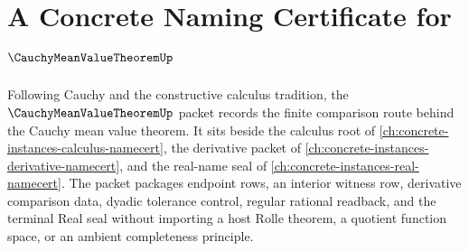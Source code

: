 \chapter{A Concrete Naming Certificate for $\CauchyMeanValueTheoremUp$}
\label{ch:concrete-instances-cauchy-mean-value-theorem-namecert}

Following Cauchy and the constructive calculus tradition, the $\CauchyMeanValueTheoremUp$ packet records the finite comparison route behind the Cauchy mean value theorem. It sits beside the calculus root of \autoref{ch:concrete-instances-calculus-namecert}, the derivative packet of \autoref{ch:concrete-instances-derivative-namecert}, and the real-name seal of \autoref{ch:concrete-instances-real-namecert}. The packet packages endpoint rows, an interior witness row, derivative comparison data, dyadic tolerance control, regular rational readback, and the terminal Real seal without importing a host Rolle theorem, a quotient function space, or an ambient completeness principle.

